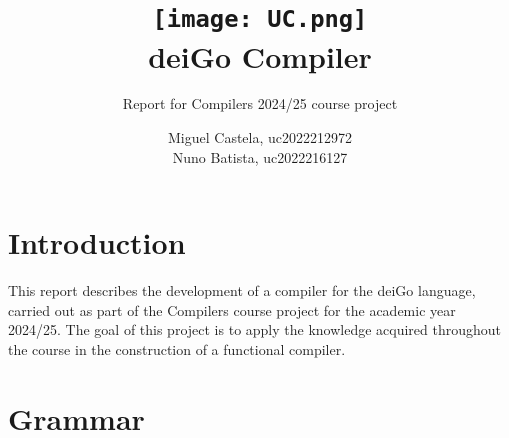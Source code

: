 \documentclass[12pt]{article}
\title{
    \vspace{-2em} %
    \texttt{[image: UC.png]} \\ 
    deiGo Compiler}
\subtitle{Report for Compilers 2024/25 course project}
\author{
Miguel Castela, uc2022212972 \\
Nuno Batista, uc2022216127}
\date{} %
\date{}
\begin{document}
\maketitle

\newpage

\section{Introduction}
This report describes the development of a compiler for the deiGo language, carried out as part of the Compilers course project for the academic year 2024/25. The goal of this project is to apply the knowledge acquired throughout the course in the construction of a functional compiler.

\section{Grammar}
    
\end{document}
